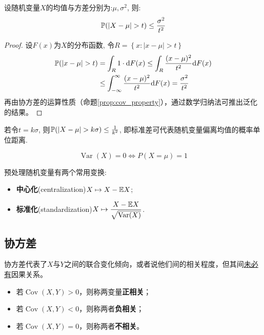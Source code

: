 \begin{theorem}[Chebyshev不等式]
    设随机变量$X$的均值与方差分别为:$\mu, \sigma^2$, 则:
    \[ \P(\left| X-\mu \right| >t)\le \frac{\sigma^{2}}{t^{2}} \]
\end{theorem}

\begin{proof}
    设$F(x)$为$X$的分布函数, 令$R=\left\{ x:|x-\mu|>t \right\}$
    \begin{align*}
        \P(|x-\mu|>t) & = \int_R 1 \cdot  \d F(x) \le \int_R \frac{(x-\mu)^2}{t^{2}}\d F(x)                   \\
                      & \le \int_{-\infty}^{\infty}\frac{(x-\mu)^2}{t^{2}}\d F(x)  = \frac{\sigma^{2}}{t^{2}}
    \end{align*}
    再由协方差的运算性质（命题\ref{prop:cov_property}），通过数学归纳法可推出泛化的结果。
\end{proof}

\begin{remark}
    若令$t=k\sigma$, 则$\P(| X-\mu | >k\sigma)\le \frac1{k^{2}}$, 即标准差可代表随机变量偏离均值的概率单位距离.
\end{remark}

\begin{corollary}\label{cor:var_almost_equal}
    \[ \operatorname{Var}(X)=0 \Leftrightarrow P(X=\mu)=1 \]
\end{corollary}

预处理随机变量有两个常用变换:
\begin{itemize}
    \item \textbf{中心化}(centralization)$X \mapsto X-\E{X}$;
    \item \textbf{标准化}(standardization)$X \mapsto \dfrac{X-\E{X}}{\sqrt{\Var(X)}}$.
\end{itemize}

\subsection{协方差}

协方差代表了$X$与$Y$之间的联合变化倾向，或者说他们间的相关程度，但其间\underline{未必有}因果关系。
\begin{itemize}
    \item 若$\operatorname{Cov} (X,Y) >0$，则称两变量\textbf{正相关}；
    \item 若$\operatorname{Cov} (X,Y) < 0$，则称两者\textbf{负相关}；
    \item 若$\operatorname{Cov} (X,Y) = 0$，则称两者\textbf{不相关}。
\end{itemize}

